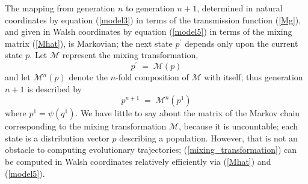 The mapping from generation $n$ to generation $n+1$, determined in
natural coordinates by equation (\ref{model3}) in terms of the
transmission function (\ref{Mg}), and given in Walsh coordinates by
equation (\ref{model5}) in terms of the mixing matrix (\ref{Mhat}), is
Markovian; the next state $p^\prime$ depends only upon the current
state $p$.  Let $\mathcal{M}$ represent the mixing transformation,
\begin{equation} \label{mixing_transformation}
p^\prime \; = \; \mathcal{M}(p)
\end{equation}
and let $\mathcal{M}^n(p)$ denote the $n$-fold composition of
$\mathcal{M}$ with itself; thus generation $n+1$ is described by
\[
p^{n+1} \; = \; \mathcal{M}^n(p^1)
\]
where $p^1 = \psi (q^1)$.  We have little to say
about the matrix of the Markov chain corresponding to the mixing
transformation $\mathcal{M}$, because it is uncountable; each state is
a distribution vector $p$ describing a population. However, that is
not an obstacle to computing evolutionary trajectories;
(\ref{mixing_transformation}) can be computed in Walsh coordinates
relatively efficiently via (\ref{Mhat}) and (\ref{model5}).

